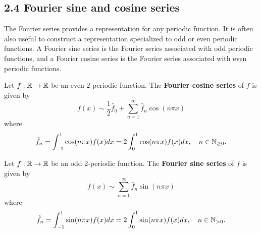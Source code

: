 
\subsection{2.4 Fourier sine and cosine series}
The Fourier series provides a representation for any periodic function. It is often also useful to construct a representation specialized to odd or even periodic functions. A Fourier sine series is the Fourier series associated with odd periodic functions, and a Fourier cosine series is the Fourier series associated with even periodic functions.

\begin{definition}
    Let $f : \mathbb{R} \to \mathbb{R}$ be an even $2$-periodic function. The \textbf{Fourier cosine series} of $f$ is given by
    \begin{equation*}
        f(x) \sim \frac{1}{2} \hat{f}_0 + \sum_{n=1}^{\infty} \hat{f}_n \cos(n\pi x) \tag{2.3}
    \end{equation*}
    where
    \[\hat{f}_n = \int_{-1}^{1} \cos(n\pi x) f(x) dx = 2 \int_0^1 \cos(n\pi x) f(x) dx, \quad n \in \mathbb{N}_{\geq 0}.\]
\end{definition}

\begin{definition}
    Let $f : \mathbb{R} \to \mathbb{R}$ be an odd $2$-periodic function. The \textbf{Fourier sine series} of $f$ is given by
    \begin{equation*}
        f(x) \sim \sum_{n=1}^{\infty} \hat{f}_n \sin(n\pi x) \tag{2.4}
    \end{equation*}
    where
    \[\hat{f}_n = \int_{-1}^{1} \sin(n\pi x) f(x) dx = 2 \int_0^1 \sin(n\pi x) f(x) dx, \quad n \in \mathbb{N}_{>0}.\]
\end{definition}

